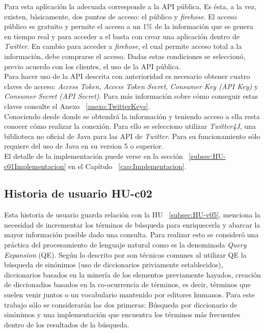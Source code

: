 Para esta aplicación la adecuada corresponde a la API pública. Es ésta, a la vez, existen, básicamente, dos puntos de acceso: el público y \textit{firehose}. El acceso público es gratuito y permite el acceso a un 1\% de la información que se genera en tiempo real y para acceder a el basta con crear una aplicación dentro de \textit{Twitter}. En cambio para acceder a \textit{firehose}, el cual permite acceso total a la información, debe comprarse el acceso. Dadas estas condiciones se seleccionó, previo acuerdo con los clientes, el uso de la API pública.\\

Para hacer uso de la API descrita con anterioridad es necesario obtener cuatro claves de acceso: \textit{Access Token}, \textit{Access Token Secret}, \textit{Consumer Key (API Key)} y \textit{Consumer Secret (API Secret)}. Para más información sobre cómo conseguir estas claves consulte el Anexo ~\ref{anexo:TwitterKeys}.\\

Conociendo desde donde se obtendrá la información y teniendo acceso a ella resta conocer cómo realizar la conexión. Para ello se selecciono utilizar \textit{Twitter4J}, una biblioteca no oficial de Java para las API de \textit{Twitter}. Para su funcionamiento sólo requiere del uso de Java en su version 5 o superior.\\

El detalle de la implementación puede verse en la sección ~\ref{subsec:HU-c01Implementacion} en el Capítulo ~\ref{cap:Implementacion}.

\subsection{Historia de usuario HU-c02}
\label{subsec:HU-c02}

Esta historia de usuario guarda relación con la HU ~\ref{subsec:HU-v05}, menciona la necesidad de incrementar los términos de búsqueda para enriquecerla y abarcar la mayor información posible dado una consulta. Para realizar esto se consideró una práctica del procesamiento de lenguaje natural como es la denominada \textit{Query Expansion} (QE). Según lo descrito por \cite{IRQE} son técnicas comunes al utilizar QE la búsqueda de sinónimos (uso de diccionarios priviamente establecidos), diccionarios basados en la minería de los elementos previamente hayados, creación de diccionadios basados en la co-ocurrencia de términos, es decir, términos que suelen venir juntos o un vocabulario mantenido por editores humanos. Para este trabajo sólo se considerarán las dos primeras: Búsqueda por diccionario de sinónimos y una implementación que encuentra los términos más frecuentes dentro de los resultados de la búsqueda.\\

